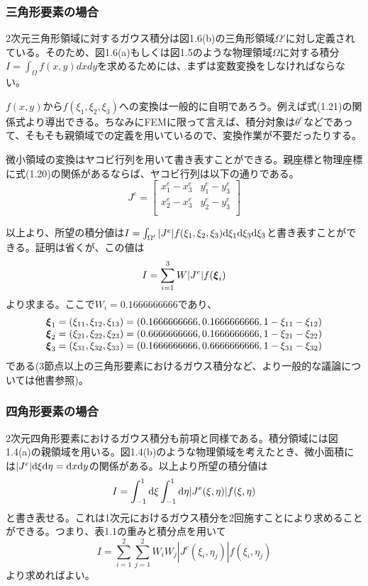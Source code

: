 \documentclass[dvipdfmx, 9pt, a4paper]{jsarticle}
\numberwithin{equation}{section}
\newcommand{\bm}[1]{{\mbox{\boldmath $#1$}}}
\begin{document}
\subsubsection{三角形要素の場合}
2次元三角形領域に対するガウス積分は図1.6(b)の三角形領域$\Omega'$に対し定義されている。そのため、図1.6(a)もしくは図1.5のような物理領域$\Omega$に対する積分$I=\int_\Omega f(x, y)dxdy$を求めるためには、まずは変数変換をしなければならない。\par
$f(x, y)$から$f(\xi_1, \xi_2, \xi_3)$への変換は一般的に自明であろう。例えば式(1.21)の関係式より導出できる。ちなみにFEMに限って言えば、積分対象は$\theta^e$などであって、そもそも親領域での定義を用いているので、変換作業が不要だったりする。\par
微小領域の変換はヤコビ行列を用いて書き表すことができる。親座標と物理座標に式(1.20)の関係があるならば、ヤコビ行列は以下の通りである。
\begin{equation}
J^e=
\begin{bmatrix}
x^e_1 - x^e_3 & y^e_1 - y^e_3 \\
x^e_2 - x^e_3 & y^e_2 - y^e_3 \\
\end{bmatrix}
\end{equation}\par
以上より、所望の積分値は$I=\int_{\Omega'}|J^e|f(\xi_1, \xi_2, \xi_3){\rm d}\xi_1{\rm d}\xi_3{\rm d}\xi_3$と書き表すことができる。証明は省くが、この値は
\begin{equation}
I=\sum_{i=1}^3 W|J^e|f(\bm \xi_i)
\end{equation}
より求まる。ここで$W_i=0.1666666666$であり、
\begin{equation}
\begin{array}{l}
\bm \xi_1=(\xi_{11}, \xi_{12}, \xi_{13})=(0.1666666666, 0.1666666666, 1 - \xi_{11}-\xi_{12}) \\
\bm \xi_2=(\xi_{21}, \xi_{22}, \xi_{23})=(0.6666666666, 0.1666666666, 1 - \xi_{21}-\xi_{22}) \\
\bm \xi_3=(\xi_{31}, \xi_{32}, \xi_{33})=(0.1666666666, 0.6666666666, 1 - \xi_{31}-\xi_{32}) \\
\end{array}
\end{equation}
である(3節点以上の三角形要素におけるガウス積分など、より一般的な議論については他書参照)。

\subsubsection{四角形要素の場合}
2次元四角形要素におけるガウス積分も前項と同様である。積分領域には図1.4(a)の親領域を用いる。図1.4(b)のような物理領域を考えたとき、微小面積には$|J^e|{\rm d}\xi{\rm d}\eta={\rm d}x{\rm d}y$の関係がある。以上より所望の積分値は
\begin{equation}
I=\int_{-1}^1 {\rm d}\xi\int_{-1}^1{\rm d}\eta|J^e(\xi, \eta)|f(\xi, \eta) \notag
\end{equation}
と書き表せる。これは1次元におけるガウス積分を2回施すことにより求めることができる。つまり、表1.1の重みと積分点を用いて
\begin{equation}
I=\sum_{i=1}^2\sum_{j=1}^2W_iW_j|J^e(\xi_i, \eta_j)|f(\xi_i, \eta_j)
\end{equation}
より求めればよい。
\end{document}
